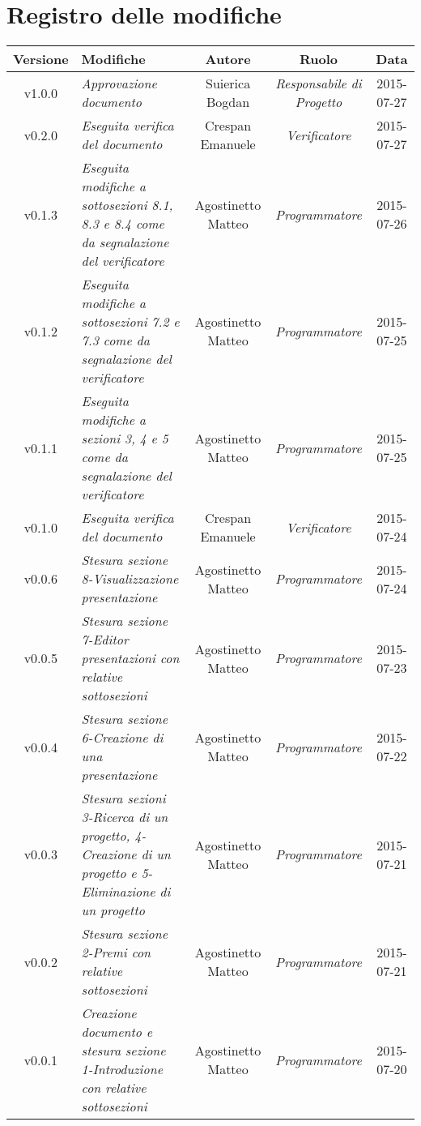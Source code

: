 \newpage
\section*{Registro delle modifiche}

\begin{table}[h]
\centering
\begin{tabular}{|c|p{}|c|c|c|}
	\toprule
		\textbf{Versione} & \textbf{Modifiche} & \textbf{Autore} & \textbf{Ruolo} & \textbf{Data}\\
	\midrule
	\midrule
		v1.0.0 & \textit{Approvazione documento} & Suierica Bogdan & \textit{Responsabile di Progetto} & 2015-07-27\\
	\midrule
		v0.2.0 & \textit{Eseguita verifica del documento} & Crespan Emanuele & \textit{Verificatore} & 2015-07-27\\
	\midrule
		v0.1.3 & \textit{Eseguita modifiche a sottosezioni 8.1, 8.3 e 8.4 come da segnalazione del verificatore} & Agostinetto Matteo & \textit{Programmatore} & 2015-07-26\\
	\midrule
		v0.1.2 & \textit{Eseguita modifiche a sottosezioni 7.2 e 7.3 come da segnalazione del verificatore} & Agostinetto Matteo & \textit{Programmatore} & 2015-07-25\\
	\midrule
		v0.1.1 & \textit{Eseguita modifiche a sezioni 3, 4 e 5 come da segnalazione del verificatore} & Agostinetto Matteo & \textit{Programmatore} & 2015-07-25\\
	\midrule
		v0.1.0 & \textit{Eseguita verifica del documento} & Crespan Emanuele & \textit{Verificatore} & 2015-07-24\\
	\midrule
		v0.0.6 & \textit{Stesura sezione 8-Visualizzazione presentazione} & Agostinetto Matteo & \textit{Programmatore} & 2015-07-24\\
	\midrule
		v0.0.5 & \textit{Stesura sezione 7-Editor presentazioni con relative sottosezioni} & Agostinetto Matteo & \textit{Programmatore} & 2015-07-23\\
	\midrule
		v0.0.4 & \textit{Stesura sezione 6-Creazione di una presentazione} & Agostinetto Matteo & \textit{Programmatore} & 2015-07-22\\
	\midrule
		v0.0.3 & \textit{Stesura sezioni 3-Ricerca di un progetto, 4-Creazione di un progetto e 5-Eliminazione di un progetto} & Agostinetto Matteo & \textit{Programmatore} & 2015-07-21\\
	\midrule
		v0.0.2 & \textit{Stesura sezione 2-Premi con relative sottosezioni} & Agostinetto Matteo & \textit{Programmatore} & 2015-07-21\\
	\midrule
		v0.0.1 & \textit{Creazione documento e stesura sezione 1-Introduzione con relative sottosezioni} & Agostinetto Matteo & \textit{Programmatore} & 2015-07-20\\	
	\bottomrule	
\end{tabular}
\end{table}
\newpage